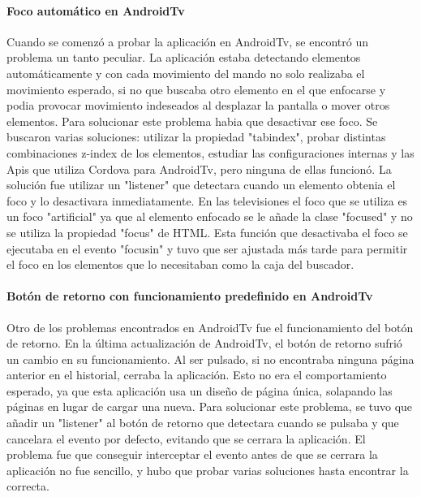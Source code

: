 \paragraph{Foco automático en AndroidTv}
Cuando se comenzó a probar la aplicación en AndroidTv, se encontró un problema un tanto peculiar. La aplicación 
estaba detectando elementos automáticamente y con cada movimiento del mando no solo realizaba el movimiento esperado,
si no que buscaba otro elemento en el que enfocarse y podia provocar movimiento indeseados al desplazar la pantalla 
o mover otros elementos. Para solucionar este problema habia que desactivar ese foco. Se buscaron varias soluciones: 
utilizar la propiedad "tabindex", probar distintas combinaciones z-index de los elementos, estudiar las configuraciones
internas y las Apis que utiliza Cordova para AndroidTv, pero ninguna de ellas funcionó. La solución fue utilizar 
un "listener" que detectara cuando un elemento obtenia el foco y lo desactivara inmediatamente. En las televisiones
el foco que se utiliza es un foco "artificial" ya que al elemento enfocado se le añade la clase "focused" y no 
se utiliza la propiedad "focus" de HTML. Esta función que desactivaba el foco se ejecutaba en el evento "focusin"
y tuvo que ser ajustada más tarde para permitir el foco en los elementos que lo necesitaban como la caja del buscador.

\paragraph{Botón de retorno con funcionamiento predefinido en AndroidTv}
Otro de los problemas encontrados en AndroidTv fue el funcionamiento del botón de retorno. En la última actualización de 
AndroidTv, el botón de retorno sufrió un cambio en su funcionamiento. Al ser pulsado, si no encontraba ninguna 
página anterior en el historial, cerraba la aplicación. Esto no era el comportamiento esperado, ya que esta aplicación 
usa un diseño de página única, solapando las páginas en lugar de cargar una nueva. Para solucionar este problema, se 
tuvo que añadir un "listener" al botón de retorno que detectara cuando se pulsaba y que cancelara el evento por defecto,
evitando que se cerrara la aplicación. El problema fue que conseguir interceptar el evento antes de que se cerrara la
aplicación no fue sencillo, y hubo que probar varias soluciones hasta encontrar la correcta.


